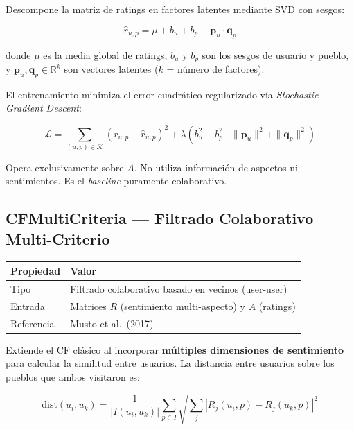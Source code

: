 \documentclass[11pt, a4paper]{article}
\begin{document}
Descompone la matriz de ratings en factores latentes mediante SVD con sesgos:

\begin{equation}
    \hat{r}_{u,p} = \mu + b_u + b_p + \mathbf{p}_u \cdot \mathbf{q}_p
\end{equation}

donde $\mu$ es la media global de ratings, $b_u$ y $b_p$ son los sesgos de usuario y pueblo, y $\mathbf{p}_u, \mathbf{q}_p \in \mathbb{R}^k$ son vectores latentes ($k$ = número de factores).

El entrenamiento minimiza el error cuadrático regularizado vía \textit{Stochastic Gradient Descent}:

\begin{equation}
    \mathcal{L} = \sum_{(u,p) \in \mathcal{K}} \left(r_{u,p} - \hat{r}_{u,p}\right)^2 + \lambda \left(b_u^2 + b_p^2 + \|\mathbf{p}_u\|^2 + \|\mathbf{q}_p\|^2\right)
\end{equation}

Opera exclusivamente sobre $A$. No utiliza información de aspectos ni sentimientos. Es el \textit{baseline} puramente colaborativo.

\subsection{CFMultiCriteria --- Filtrado Colaborativo Multi-Criterio}

\begin{table}[H]\centering
\begin{tabular}{ll}
\toprule
\textbf{Propiedad} & \textbf{Valor} \\
\midrule
Tipo      & Filtrado colaborativo basado en vecinos (user-user) \\
Entrada   & Matrices $R$ (sentimiento multi-aspecto) y $A$ (ratings) \\
Referencia & Musto et al.\ (2017) \\
\bottomrule
\end{tabular}
\end{table}

Extiende el CF clásico al incorporar \textbf{múltiples dimensiones de sentimiento} para calcular la similitud entre usuarios. La distancia entre usuarios sobre los pueblos que ambos visitaron es:

\begin{equation}
    \text{dist}(u_i, u_k) = \frac{1}{|I(u_i, u_k)|} \sum_{p \in I} \sqrt{\sum_j \left|R_j(u_i, p) - R_j(u_k, p)\right|^2}
\end{equation}
\end{document}
